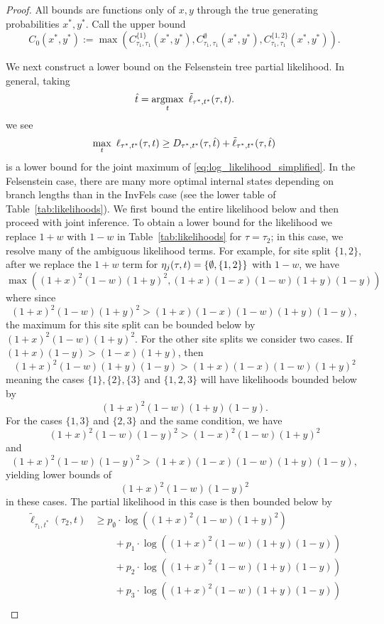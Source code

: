 \begin{proof}
All bounds are functions only of $x,y$ through the true generating probabilities $x^*, y^*$.
Call the upper bound
\[
C_0(x^*, y^*) := \max\left(C^{\{1\}}_{\tau_1,\tau_1}(x^*, y^*), C^{\emptyset}_{\tau_1,\tau_1}(x^*, y^*), C^{\{1,2\}}_{\tau_1,\tau_1}(x^*, y^*)\right).
\]

We next construct a lower bound on the Felsenstein tree partial likelihood.
In general, taking
\[
\hat{t} = \operatorname*{argmax}_{t} \ \tilde{\ell}_{\tau^*,t^*}(\tau, t).
\]
we see
\[
\max_{t} \ \ell_{\tau^*,t^*}(\tau, t) \ge
    D_{\tau^*,t^*}(\tau,\hat{t})
    + \tilde{\ell}_{\tau^*,t^*}(\tau, \hat{t})
\]
is a lower bound for the joint maximum of \eqref{eq:log_likelihood_simplified}.
In the Felsenstein case, there are many more optimal internal states depending on branch lengths than in the InvFels case (see the lower table of Table~\ref{tab:likelihoods}).
We first bound the entire likelihood below and then proceed with joint inference.
To obtain a lower bound for the likelihood we replace $1+w$ with $1-w$ in Table~\ref{tab:likelihoods} for $\tau = \tau_2$; in this case, we resolve many of the ambiguous likelihood terms.
For example, for site split $\{1,2\}$, after we replace the $1+w$ term for $\eta_j(\tau, t)=\{\emptyset, \{1,2\}\}$ with $1-w$, we have
\[
\max\left((1+x)^2 (1-w)(1+y)^2, (1+x)(1-x)(1-w)(1+y)(1-y)\right)
\]
where since
\[
(1+x)^2 (1-w)(1+y)^2 > (1+x)(1-x)(1-w)(1+y)(1-y),
\]
the maximum for this site split can be bounded below by $(1+x)^2 (1-w)(1+y)^2$.
For the other site splits we consider two cases.
If $(1+x)(1-y) > (1-x)(1+y)$, then
\[
(1+x)^2(1-w)(1+y)(1-y) > (1+x)(1-x)(1-w)(1+y)^2
\]
meaning the cases $\{1\}, \{2\}, \{3\}$ and $\{1,2,3\}$ will have likelihoods bounded below by
\[
(1+x)^2(1-w)(1+y)(1-y).
\]
For the cases $\{1,3\}$ and $\{2,3\}$ and the same condition, we have
\[
(1+x)^2(1-w)(1-y)^2 > (1-x)^2(1-w)(1+y)^2
\]
and
\[
(1+x)^2(1-w)(1-y)^2 > (1+x)(1-x)(1-w)(1+y)(1-y),
\]
yielding lower bounds of
\[
(1+x)^2(1-w)(1-y)^2
\]
in these cases.
The partial likelihood in this case is then bounded below by
\begin{align*}
    \tilde{\ell}_{\tau_1,t^*}(\tau_2, t)
    &\ge      p_{\emptyset}  \cdot\log((1+x)^2   (1-w)(1+y)^2) \\
    &\qquad + p_{1}          \cdot\log((1+x)^2   (1-w)(1+y)(1-y)) \\
    &\qquad + p_{2}          \cdot\log((1+x)^2   (1-w)(1+y)(1-y)) \\
    &\qquad + p_{3}          \cdot\log((1+x)^2   (1-w)(1+y)(1-y)) \\

\end{align*}
\end{proof}

